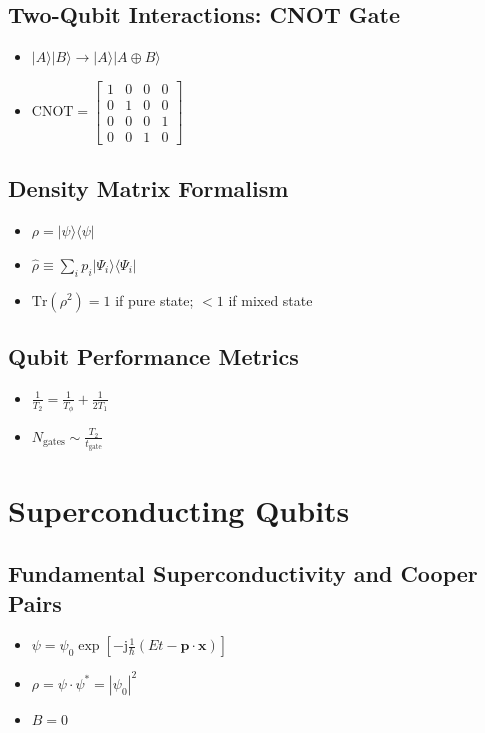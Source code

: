 \documentclass{article}
\begin{document}
\subsection*{Two-Qubit Interactions: CNOT Gate}
\begin{itemize}
    \item $|A\rangle|B\rangle \to |A\rangle|A \oplus B\rangle$
    \item $\text{CNOT} = \begin{bmatrix} 1 & 0 & 0 & 0 \\ 0 & 1 & 0 & 0 \\ 0 & 0 & 0 & 1 \\ 0 & 0 & 1 & 0 \end{bmatrix}$
\end{itemize}

\subsection*{Density Matrix Formalism}
\begin{itemize}
    \item $\rho = |\psi\rangle\langle\psi|$
    \item $\widehat{\rho} \equiv \sum_i p_i|\Psi_i\rangle\langle\Psi_i|$
    \item $\mathrm{Tr}(\rho^2) = 1$ if pure state; $< 1$ if mixed state
\end{itemize}

\subsection*{Qubit Performance Metrics}
\begin{itemize}
    \item $\frac{1}{T_2} = \frac{1}{T_\phi} + \frac{1}{2T_1}$
    \item $N_{\text{gates}} \sim \frac{T_2}{t_{\text{gate}}}$
\end{itemize}


\newpage
\section{Superconducting Qubits}

\subsection*{Fundamental Superconductivity and Cooper Pairs}
\begin{itemize}
    \item $\psi = \psi_0 \exp\left[-\mathrm{j}\frac{1}{\hbar}(Et - \mathbf{p} \cdot \mathbf{x})\right]$
    \item $\rho = \psi \cdot \psi^* = |\psi_0|^2$
    \item $B = 0$
\end{itemize}
\end{document}
